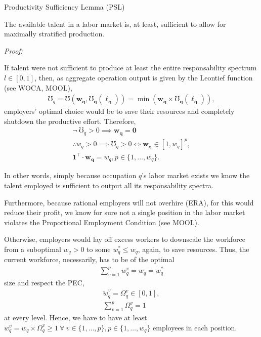 \documentclass[hidelinks, nonatbib]{elsarticle}
\begin{document}
Productivity Sufficiency Lemma (PSL)

The available talent in a labor market is, at least, sufficient to allow for maximally stratified production.

\textit{Proof:}

If talent were not sufficient to produce at least the entire responsability spectrum $l \in [0,1]$, then, as aggregate operation output is given by the Leontief function (see WOCA, MOOL),
\begin{gather}
\mho_q = 
\mho(
    \boldsymbol{w_q}
    ,
    \boldsymbol{\mho_q}(
        \boldsymbol{\ell_q}
    )
) = 
\min\left(
    \boldsymbol{w_q}
    \times
    \boldsymbol{\mho_q}(
        \boldsymbol{\ell_q}
    )
\right)
,
\end{gather}
employers' optimal choice would be to save their resources and completely shutdown the productive effort. Therefore,
\begin{gather}
\lnot \
\mho_q > 0
\implies
\boldsymbol{w_q} =
\boldsymbol{0}
\\
\therefore
w_q > 0 
\implies 
\mho_q > 0
\iff
\boldsymbol{w_q}
\in
[1,w_q] ^ {p}
,
\\
\boldsymbol{1} ^ \top
\cdot
\boldsymbol{w_q}
=
w_q
,
p \in \{1,\dots, w_q\}
.
\end{gather}

In other words, simply because occupation $q$'s labor market exists we know the talent employed is sufficient to output all its responsability spectra.

Furthermore, because rational employers will not overhire (ERA), for this would reduce their profit, we know for sure not a single position in the labor market violates the Proportional Employment Condition (see MOOL).

Otherwise, employers would lay off excess workers to downscale the workforce from a suboptimal $w_q > 0$ to some $w_{q}^{*} \leq w_q$, again, to save resources. Thus, the current workforce, necessarily, has to be of the optimal
\begin{gather}
\sum_{v=1}^{p}
w_{q}^{v}
=
w_q
=
w_{q}^{*}
\end{gather}
size and respect the PEC,
\begin{gather}
\tilde{w}_{q}^{v}
=
\Omega_{q}^{v}
\in
[0,1]
,
\\
\sum_{v=1}^{p}
\Omega_{q}^{v}
=
1
\end{gather}
at every level. Hence, we have to have at least $w_{q}^{v} = w_q \times \Omega_{q}^{v} \geq 1 \ \forall \ v \in \{1,\dots, p\}, p \in \{1,\dots, w_q\}$ employees in each position.
\end{document}
